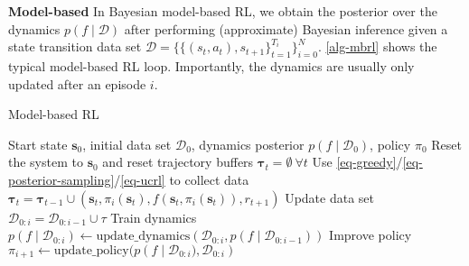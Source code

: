 \documentclass{article}
\newcommand{\state}{\ensuremath{\mathbf{s}}}
\newcommand{\action}{\ensuremath{\mathbf{a}}}
\newcommand{\dataset}{\ensuremath{\mathcal{D}}}
\newcommand{\transitionFn}{\ensuremath{f}}
\newcommand{\policy}{\ensuremath{\pi}}
\begin{document}
\textbf{Model-based}
In Bayesian model-based RL, we obtain the posterior over the dynamics \(p(f\mid\mathcal{D})\) after performing (approximate) Bayesian
inference given a state transition data set \(\mathcal{D} = \{\{(s_{t},a_{t}), s_{t+1}\}^{T_{i}}_{t=1}\}_{i=0}^{N}\).
\cref{alg-mbrl} shows the typical model-based RL loop.
Importantly, the dynamics are usually only updated after an episode $i$.

\begin{algorithm}[!t]
\caption{Model-based RL}\label{alg-mbrl}
\begin{algorithmic}[1]
  \Require Start state $\state_{0}$, initial data set $\dataset_{0}$, dynamics posterior $p(\transitionFn \mid \dataset_{0})$, policy $\policy_{0}$
    \State Reset the system to $\state_{0}$ and reset trajectory buffers $\bm\tau_{t} = \emptyset \ \forall t$
      \State Use \cref{eq-greedy}/\cref{eq-posterior-sampling}/\cref{eq-ucrl} to collect data $\bm\tau_{t} = \bm\tau_{t-1} \cup (\state_{t}, \policy_{i}(\state_{t}), \transitionFn(\state_{t}, \policy_{i}(\state_{t})), r_{t+1})$
    \EndFor
    \State Update data set $\dataset_{0:i} = \dataset_{0:i-1} \cup \tau$
    \State Train dynamics $p(\transitionFn \mid \dataset_{0:i}) \leftarrow \text{update\_dynamics}(\dataset_{0:i}, p(\transitionFn \mid \dataset_{0:i-1}))$
    \State Improve policy $\pi_{i+1} \leftarrow \text{update\_policy}(p\left(\transitionFn \mid \dataset_{0:i}), \dataset_{0:i} \right)$
\EndFor
\end{algorithmic}
\end{algorithm}
\end{document}
